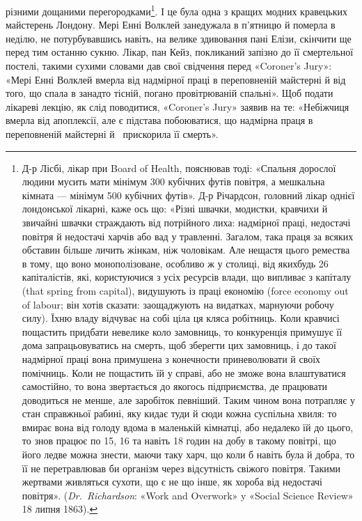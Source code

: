 різними дощаними перегородками\footnote{
Д-р Лісбі, лікар при Board of Health, пояснював тоді: «Спальня
дорослої людини мусить мати мінімум 300 кубічних футів повітря, а
мешкальна кімната — мінімум 500 кубічних футів». Д-р Річардсон,
головний лікар однієї лондонської лікарні, каже ось що: «Різні швачки,
модистки, кравчихи й звичайні швачки страждають від потрійного лиха:
надмірної праці, недостачі повітря й недостачі харчів або вад у травленні.
Загалом, така праця за всяких обставин більше личить жінкам, ніж чоловікам.
Але нещастя цього ремества в тому, що воно монополізоване, особливо
ж у столиці, від якихбудь 26 капіталістів, які, користуючися з
усіх ресурсів влади, що випливає з капіталу (that spring from capital),
видушують із праці економію (force economy out of labour; він хотів сказати:
заощаджують на видатках, марнуючи робочу силу). Їхню владу
відчуває на собі ціла ця кляса робітниць. Коли кравчисі пощастить придбати
невелике коло замовниць, то конкуренція примушує її дома запрацьовуватись
на смерть, щоб зберегти цих замовниць, і до такої надмірної
праці вона примушена з конечности приневолювати й своїх помічниць.
Коли не пощастить їй у справі, або не зможе вона влаштуватися самостійно,
то вона звертається до якогось підприємства, де працювати доводиться
не менше, але заробіток певніший. Таким чином вона потрапляє у стан
справжньої рабині, яку кидає туди й сюди кожна суспільна хвиля: то вмирає
вона від голоду вдома в маленькій кімнатці, або недалеко їй до цього,
то знов працює по 15, 16 та навіть 18 годин на добу в такому повітрі, що
його ледве можна знести, маючи таку харч, що коли б навіть була й добра,
то її не перетравлював би організм через відсутність свіжого повітря.
Такими жертвами живляться сухоти, що є не що інше, як хороба від недостачі
повітря». (\emph{Dr.~Richardson}: «Work and Overwork» y «Social Science
Review» 18 липня 1863).
}. І це була одна з кращих
модних кравецьких майстерень Лондону. Мері Енні Волклей
занедужала в п’ятницю й померла в неділю, не потурбувавшись
навіть, на велике здивовання пані Елізи, скінчити ще перед тим
останню сукню. Лікар, пан Кейз, покликаний запізно до її смертельної
постелі, такими сухими словами дав свої свідчення перед
«Coroner’s Jury»: «Мері Енні Волклей вмерла від надмірної праці
в переповненій майстерні й від того, що спала в занадто тісній,
погано провітрюваній спальні». Щоб подати лікареві лекцію,
як слід поводитися, «Coroner’s Jury» заявив на те: «Небіжчиця
вмерла від апоплексії, але є підстава побоюватися, що надмірна
праця в переповненій майстерні й~ прискорила її смерть».
\parbreak{}  %
